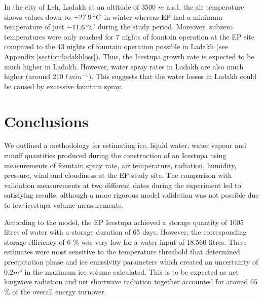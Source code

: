 \documentclass[utf8]{frontiersSCNS} %
\begin{document}
In the city of Leh, Ladakh at an altitude of 3500 $m$ a.s.l. the air temperature shows values down to $-27.9\, \degree
C$ in winter \citep{Chevuturi_2018} whereas EP had a minimum temperature of just  $-11.6\,\degree C$ during the
study period. Moreover, subzero temperatures were only reached for 7 nights of fountain operation at the EP
site compared to the 43 nights of fountain operation possible in Ladakh (see Appendix \ref{section:ladakhloss}). Thus,
the Icestupa growth rate is expected to be much higher in Ladakh. However, water spray rates in Ladakh are also much
higher (around 210 $l\,min^{-1}$). This suggests that the water losses in Ladakh could be caused by excessive fountain spray.



\section{Conclusions} We outlined a methodology for estimating ice, liquid water, water vapour and runoff
quantities produced during the construction of an Icestupa using measurements of fountain spray rate, air temperature,
radiation, humidity, pressure, wind and cloudiness at the EP study site. The comparison with validation
measurements at two different dates during the experiment led to satisfying results, although a more rigorous model
validation was not possible due to few icestupa volume measurements.

According to the model, the EP Icestupa achieved a storage quantity of 1005 litres of water with a storage
duration of 65 days. However, the corresponding storage efficiency of 6 \% was very low for a water input of 18,560
litres. These estimates were most sensitive to the temperature threshold that determined precipitation phase and ice
emissivity parameters which created an uncertainty of $0.2 m^3$ in the maximum ice volume calculated.  This is
to be expected as net longwave radiation and net shortwave radiation together accounted for around 65 \% of the overall
energy turnover.
\end{document}
